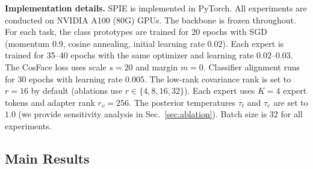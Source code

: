 \noindent\textbf{Implementation details.}
SPIE is implemented in PyTorch. All experiments are conducted on NVIDIA A100 (80G) GPUs. The backbone is frozen throughout. For each task, the class prototypes are trained for 20 epochs with SGD (momentum $0.9$, cosine annealing, initial learning rate $0.02$). Each expert is trained for 35--40 epochs with the same optimizer and learning rate $0.02$--$0.03$. The CosFace loss uses scale $s=20$ and margin $m=0$. Classifier alignment runs for 30 epochs with learning rate $0.005$. The low-rank covariance rank is set to $r=16$ by default (ablations use $r \in \{4, 8, 16, 32\}$). Each expert uses $K=4$ expert tokens and adapter rank $r_v=256$. The posterior temperatures $\tau_t$ and $\tau_e$ are set to $1.0$ (we provide sensitivity analysis in Sec.~\ref{sec:ablation}). Batch size is $32$ for all experiments.

\subsection{Main Results}
\label{sec:main_results}


